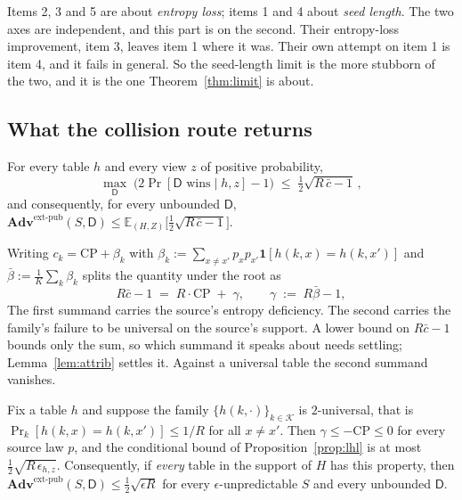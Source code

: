 \documentclass{aicr-solution}
\newcommand{\Adv}{\mathbf{Adv}}
\newcommand{\extp}{\mathrm{ext}\text{-}\mathrm{pub}}
\newcommand{\calK}{\mathcal{K}}
\newcommand{\CP}{\mathrm{CP}}
\begin{document}
Items 2, 3 and 5 are about \emph{entropy loss}; items 1 and 4 about \emph{seed length}. The two
axes are independent, and this part is on the second. Their entropy-loss improvement, item 3,
leaves item 1 where it was. Their own attempt on item 1 is item 4, and it fails in general. So the
seed-length limit is the more stubborn of the two, and it is the one Theorem~\ref{thm:limit} is
about.

\subsection*{What the collision route returns}

\begin{proposition}\label{prop:lhl}
For every table $h$ and every view $z$ of positive probability,
\[
  \max_{\mathsf{D}} \; \bigl(2\Pr[\mathsf{D} \text{ wins} \mid h,z] - 1\bigr)
  \;\le\; \tfrac12\sqrt{R\,\bar c - 1} \, ,
\]
and consequently, for every unbounded $\mathsf{D}$,
$\Adv^{\extp}(S,\mathsf{D}) \le \mathbb{E}_{(H,Z)}\bigl[\tfrac12\sqrt{R\,\bar c - 1}\bigr]$.
\end{proposition}

Writing $c_k = \CP + \beta_k$ with
$\beta_k := \sum_{x \neq x'} p_x p_{x'} \mathbf{1}[h(k,x) = h(k,x')]$ and
$\bar\beta := \frac1K\sum_k \beta_k$ splits the quantity under the root as
\begin{equation}\label{eq:split}
  R \bar c - 1 \;=\; R\cdot\CP \;+\; \gamma ,
  \qquad \gamma \;:=\; R\bar\beta - 1 ,
\end{equation}
The first summand carries the source's entropy deficiency. The second carries the family's failure
to be universal on the source's support. A lower bound on $R\bar c - 1$ bounds only the sum, so
which summand it speaks about needs settling; Lemma~\ref{lem:attrib} settles it. Against a
universal table the second summand vanishes.

\begin{proposition}\label{prop:univ}
Fix a table $h$ and suppose the family $\{h(k,\cdot)\}_{k \in \calK}$ is $2$-universal, that is
$\Pr_{k}[h(k,x) = h(k,x')] \le 1/R$ for all $x \neq x'$. Then $\gamma \le -\CP \le 0$ for every
source law $p$, and the conditional bound of Proposition~\ref{prop:lhl} is at most
$\tfrac12\sqrt{R\,\epsilon_{h,z}}$. Consequently, if \emph{every} table in the support of $H$ has
this property, then $\Adv^{\extp}(S,\mathsf{D}) \le \tfrac12\sqrt{\epsilon R}$ for every
$\epsilon$-unpredictable $S$ and every unbounded $\mathsf{D}$.
\end{proposition}
\end{document}
